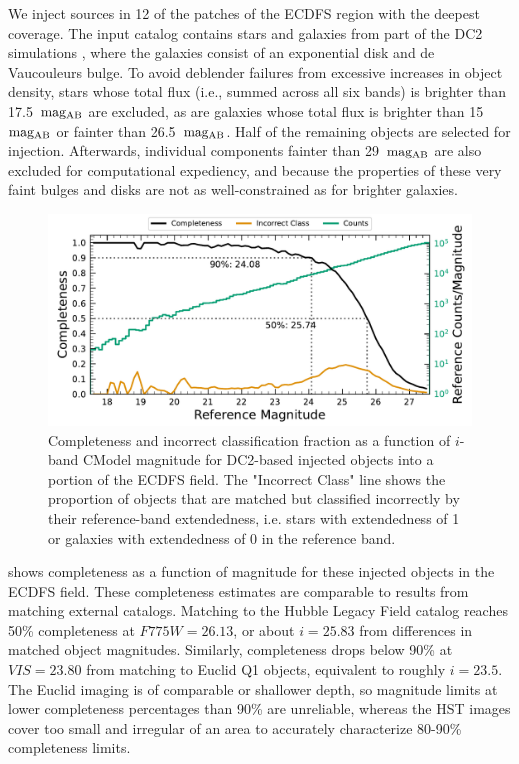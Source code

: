 We inject sources in 12 of the patches of the \gls{ECDFS} region with the deepest coverage.
The input catalog contains stars and galaxies from part of the \gls{DC2} simulations \citep{2021ApJS..253...31L}, where the galaxies consist of an exponential disk and de Vaucouleurs \citep{1948AnAp...11..247D,1953MNRAS.113..134D} bulge.
To avoid deblender failures from excessive increases in object density, stars whose total \gls{flux} (i.e., summed across all six bands) is brighter than 17.5~${\rm mag_{\rm AB}}$ are excluded, as are galaxies whose total \gls{flux} is brighter than 15~${\rm mag_{AB}}$ or fainter than 26.5~${\rm mag_{AB}}$.
Half of the remaining objects are selected for injection.
Afterwards, individual components fainter than 29~${\rm mag_{AB}}$ are also excluded for computational expediency, and because the properties of these very faint bulges and disks are not as well-constrained as for brighter galaxies.
\begin{figure}[htb]
\centering
\includegraphics[width=0.98\linewidth]{figures/performance/injected_lsst_cells_v1_5063_i_completeness_any.pdf}
\caption{Completeness and incorrect classification fraction as a function of $i$-band CModel magnitude for DC2-based injected objects into a portion of the ECDFS field. 
The "Incorrect Class" line shows the proportion of objects that are matched but classified incorrectly by their reference-band extendedness, i.e. stars with extendedness of 1 or galaxies with extendedness of 0 in the reference band.}
\label{fig:injected_lsst_cells_v1_5063_i_completeness_any}
\vspace{0.1cm}
\end{figure}

 shows completeness as a function of magnitude for these injected objects in the \gls{ECDFS} field.
These completeness estimates are comparable to results from matching external catalogs. 
Matching to the Hubble Legacy Field catalog \citep{2016arXiv160600841I, 2019ApJS..244...16W} reaches 50\% completeness at $F775W=26.13$, or about $i=25.83$ from differences in matched object magnitudes.
Similarly, completeness drops below 90\% at $VIS=23.80$ from matching to Euclid Q1 \citep{2025arXiv250315305E} objects, equivalent to roughly $i=23.5$. 
The Euclid imaging is of comparable or shallower depth, so magnitude limits at lower completeness percentages than 90\% are unreliable, whereas the HST images cover too small and irregular of an area to accurately characterize 80-90\% completeness limits.

